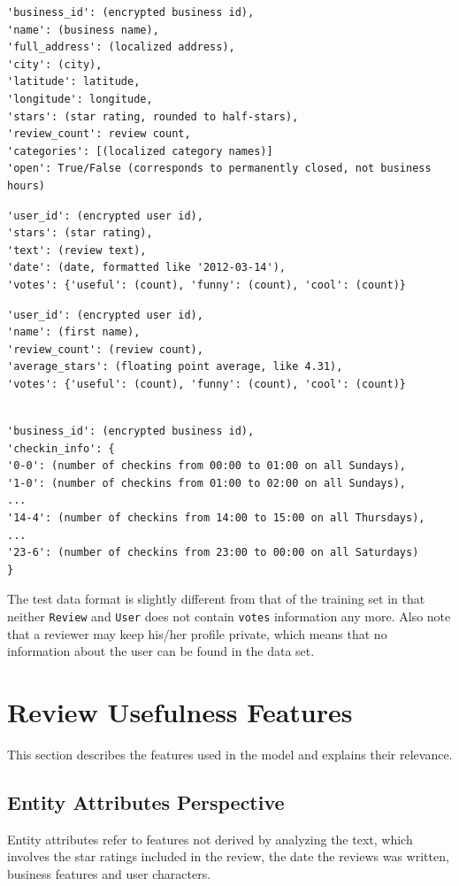 \documentclass[a4paper,12pt,title]{article}
\begin{document}
\begin{lstlisting}[caption=Business]
'business_id': (encrypted business id),
'name': (business name),
'full_address': (localized address),
'city': (city),
'latitude': latitude,
'longitude': longitude,
'stars': (star rating, rounded to half-stars),
'review_count': review count,
'categories': [(localized category names)]
'open': True/False (corresponds to permanently closed, not business hours)
\end{lstlisting}
\begin{lstlisting}[caption=Review]
'user_id': (encrypted user id),
'stars': (star rating),
'text': (review text),
'date': (date, formatted like '2012-03-14'),
'votes': {'useful': (count), 'funny': (count), 'cool': (count)}
\end{lstlisting}
\begin{lstlisting}[caption=User]
'user_id': (encrypted user id),
'name': (first name),
'review_count': (review count),
'average_stars': (floating point average, like 4.31),
'votes': {'useful': (count), 'funny': (count), 'cool': (count)}
\end{lstlisting}
\begin{lstlisting}[caption=Checkin]

'business_id': (encrypted business id),
'checkin_info': {
'0-0': (number of checkins from 00:00 to 01:00 on all Sundays), 
'1-0': (number of checkins from 01:00 to 02:00 on all Sundays), 
... 
'14-4': (number of checkins from 14:00 to 15:00 on all Thursdays), 
... 
'23-6': (number of checkins from 23:00 to 00:00 on all Saturdays)
}
\end{lstlisting}

The test data format is slightly different from that of the training set in that neither \texttt{Review} and \texttt{User} does not contain \texttt{votes} information any more. Also note that a reviewer may keep his/her profile private, which means that no information about the user can be found in the data set.


\section{Review Usefulness Features}
This section describes the features used in the model and explains their relevance.

\subsection{Entity Attributes Perspective}
Entity attributes refer to features not derived by analyzing the text, which involves the star ratings included in the review, the date the reviews was written, business features and user characters.
\end{document}
